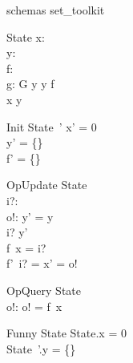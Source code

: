 \documentclass{article}
\begin{document}
\begin{zsection}
\SECTION schemas \parents set\_toolkit
\end{zsection}

\begin{zed}
   [G]
\end{zed}

\zstate
\begin{schema}{State}
   x: \nat \\
   y: \power~\nat \\
   f: \nat \fun \nat \\
   g: G
\where
   y \cross y \subseteq f \\
   x \in y
\end{schema}

\zstinit
\begin{schema}{Init}
   State~'
\where
   x' = 0 \\
   y' = \{\} \\
   f' = \{\}
\end{schema}

\begin{schema}{OpUpdate}
   \Delta State \\
   i?: \nat \\
   o!: \nat
\where
   y' = y \\
   i? \in y' \\
   f~x = i? \\
   f'~i? = x' = o!
\end{schema}

\begin{schema}{OpQuery}
  \Xi State \\
  o!: \nat
\where
   o! = f~x
\end{schema}

\begin{schema}{Funny}
   \Delta State
\where
   \theta State.x = 0 \\
   \theta State~'.y = \{\} 
\end{schema}
\end{document}
